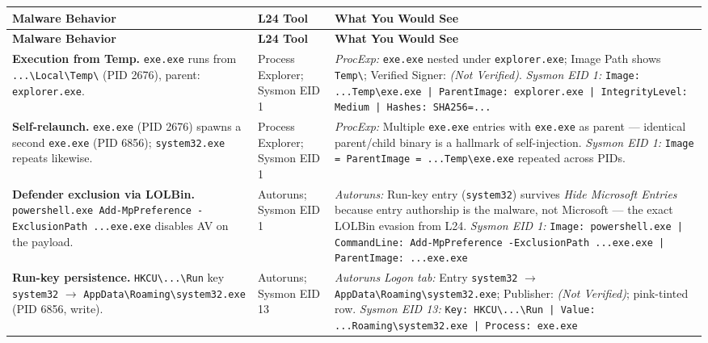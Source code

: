 \documentclass[10pt]{article}
\begin{document}
\renewcommand{\arraystretch}{1.6}
\begin{longtable}{>{\raggedright\arraybackslash}p{3.8cm}
                  >{\raggedright\arraybackslash}p{2.8cm}
                  >{\raggedright\arraybackslash}p{8.4cm}}
 
\toprule
\textbf{Malware Behavior} &
\textbf{L24 Tool} &
\textbf{What You Would See} \\
\midrule
\endfirsthead
\toprule
\textbf{Malware Behavior} & \textbf{L24 Tool} & \textbf{What You Would See} \\
\midrule
\endhead
\bottomrule
\endfoot
 
\rowcolor{rowgray}
\textbf{Execution from Temp.}
\texttt{exe.exe} runs from \texttt{...\textbackslash Local\textbackslash Temp\textbackslash}
(PID 2676), parent: \texttt{explorer.exe}.
&
Process Explorer; Sysmon EID 1
&
\textit{ProcExp:} \texttt{exe.exe} nested under \texttt{explorer.exe}; Image Path shows \texttt{Temp\textbackslash}; Verified Signer: \emph{(Not Verified)}.
\textit{Sysmon EID 1:} \texttt{Image: ...Temp\textbackslash exe.exe | ParentImage: explorer.exe | IntegrityLevel: Medium | Hashes: SHA256=...} \\
 
\textbf{Self-relaunch.}
\texttt{exe.exe} (PID 2676) spawns a second \texttt{exe.exe} (PID 6856); \texttt{system32.exe} repeats likewise.
&
Process Explorer; Sysmon EID 1
&
\textit{ProcExp:} Multiple \texttt{exe.exe} entries with \texttt{exe.exe} as parent --- identical parent/child binary is a hallmark of self-injection.
\textit{Sysmon EID 1:} \texttt{Image = ParentImage = ...Temp\textbackslash exe.exe} repeated across PIDs. \\
 
\rowcolor{rowgray}
\textbf{Defender exclusion via LOLBin.}
\texttt{powershell.exe Add-MpPreference -ExclusionPath ...exe.exe} disables AV on the payload.
&
Autoruns; Sysmon EID 1
&
\textit{Autoruns:} Run-key entry (\texttt{system32}) survives \emph{Hide Microsoft Entries} because entry authorship is the malware, not Microsoft --- the exact LOLBin evasion from L24.
\textit{Sysmon EID 1:} \texttt{Image: powershell.exe | CommandLine: Add-MpPreference -ExclusionPath ...exe.exe | ParentImage: ...exe.exe} \\
 
\textbf{Run-key persistence.}
\texttt{HKCU\textbackslash...\textbackslash Run} key \texttt{system32} $\to$ \texttt{AppData\textbackslash Roaming\textbackslash system32.exe} (PID 6856, write).
&
Autoruns; Sysmon EID 13
&
\textit{Autoruns Logon tab:} Entry \texttt{system32} $\to$ \texttt{AppData\textbackslash Roaming\textbackslash system32.exe}; Publisher: \emph{(Not Verified)}; pink-tinted row.
\textit{Sysmon EID 13:} \texttt{Key: HKCU\textbackslash...\textbackslash Run | Value: ...Roaming\textbackslash system32.exe | Process: exe.exe} \\
 

\end{longtable}
\end{document}
